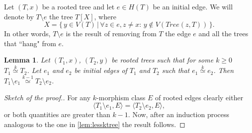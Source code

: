 \documentclass[11pt,notitlepage,a4paper]{article}
\newtheorem{lemma}{Lemma}[section]
\theoremstyle{definition}
\newcommand{\morph}[1]{\stackrel{#1}{\simeq}}
\begin{document}
Let $(T,x)$ be a rooted tree and let $e\in H(T)$ be an initial edge.
We will denote by $T\setminus e$ the tree $T[X]$, where
\[ X= \{\, y\in V(T) \, | \, \forall z\in e, z\neq x: \, y\notin V(Tree(z,T)) \, \}.\]
In other words, $T\setminus e$ is the result of removing from $T$ the edge $e$ and
all the trees that ``hang" from $e$. 

\begin{lemma} \label{lem:minusedge}
	Let $(T_1,x)$, $(T_2, y)$ be rooted trees such that for some $k\geq 0$
	$T_1\morph{k} T_2$. Let $e_1$ and $e_2$ be initial edges of $T_1$ and $T_2$
	such that $e_1\morph{k} e_2$. Then $T_1\setminus e_1\morph{k-1} T_2\setminus e_2$.
\end{lemma}
\begin{proof}[Sketch of the proof.]
	For any $k$-morphism class $E$ of rooted edges clearly either
	\[\langle T_1\setminus e_1,E \rangle =\langle T_2\setminus e_2,E \rangle ,\]
	or both quantities are greater than $k-1$.
	Now, after an induction process analogous to the one in \cref{lem:lessktree}
	the result follows. 	
\end{proof}
\end{document}
